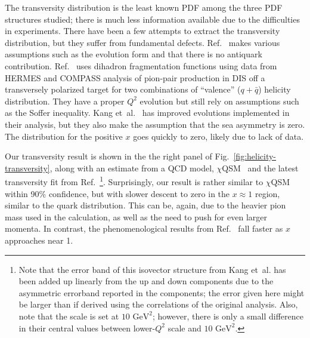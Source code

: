 The transversity distribution is the least known PDF among the three
PDF structures studied;
there is much less information available due to the difficulties in experiments.
There have been a few attempts to extract the transversity distribution, but
they suffer from fundamental defects.
Ref.~\cite{Anselmino:2008jk} makes various assumptions such as the evolution form and that there is no antiquark contribution.
Ref.~\cite{Radici:2013vra} uses dihadron fragmentation functions using data from HERMES and COMPASS analysis of pion-pair production in DIS off a transversely polarized target for two combinations of ``valence'' ($q+\bar{q}$)
helicity distribution. They have a proper $Q^2$ evolution but still rely on
assumptions such as the Soffer inequality.
Kang et~al.~\cite{Kang:2015msa} has improved evolutions implemented in their analysis, but they also make the assumption
that the sea asymmetry is zero. The distribution for the positive $x$ goes quickly to zero,
likely due to lack of data.

Our transversity result is shown in the
the right panel of Fig.~\ref{fig:helicity-transversity}, along with an estimate from a QCD model,
$\chi$QSM~\cite{Schweitzer:2001sr} and the latest transversity fit from Ref.~\cite{Kang:2015msa}\footnote{Note that the error band of this isovector structure from Kang et~al. has been added up linearly from the up and down components due to the asymmetric errorband reported in the components; the error given here might be larger than if derived using the correlations of the original analysis. Also, note that the scale is set at $10\mbox{ GeV}^2$; however, there is only a small difference in their central values between lower-$Q^2$ scale and $10\mbox{ GeV}^2$.}.
Surprisingly, our result is rather similar to $\chi$QSM within 90\% confidence, but with slower descent to zero in 
the $x\approx 1$ region, similar to the quark distribution. This can be, again, due to the heavier pion mass used in the 
calculation, as well as the need to push for even larger momenta.
In contrast, the phenomenological results from Ref.~\cite{Kang:2015msa} fall faster as $x$ approaches near 1.

